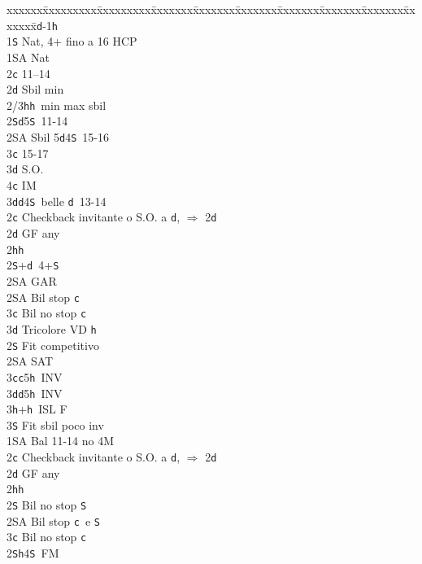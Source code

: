 \documentclass[a4paper,italian]{article}
\newcommand{\BS}{\small{\texttt{S}}}
\newcommand{\BC}{\small{\texttt{c}}}
\newcommand{\BD}{\small{\texttt{d}}}
\newcommand{\BH}{\small{\texttt{h}}}
\newenvironment{bidtable}
{\begin{tabbing}

    xxxxxx\=xxxxxxxxx\=xxxxxxxxx\=xxxxxxx\=xxxxxxx\=xxxxxxx\=xxxxxxx\=xxxxxxx\=xxxxxxx\=xxxxxxx\=\kill}
{\end{tabbing} }%
\begin{document}
\begin{multicols}{2}
    \begin{bidtable}
        1\BD-1\BH\+\\
        1\BS \> Nat, 4+ fino a 16 HCP\+\\
        1\small{SA} \> Nat\+\\
        2\BC {} 11--14\\
        2\BD \> Sbil min\\
        2/3\BH {}\BH\ min max sbil\\
        2\BS {}\BD 5\BS\ 11-14\\
        2\small{SA} \> Sbil 5\BD 4\BS\ 15-16\\
        3\BC {} 15-17\+\\
        3\BD \> S.O.\\
        4\BC \> IM\-\\
        3\BD {}\BD 4\BS\ belle \BD\ 13-14\-\\
        2\BC \> Checkback invitante o S.O. a \BD , $\Rightarrow$ 2\BD \\
        2\BD \> GF any\+\\
        2\BH {}\BH \\
        2\BS {}+\BD\ 4+\BS \+\\
        2\small{SA} \> GAR\-\\
        2\small{SA} \> Bil stop \BC \\
        3\BC \> Bil no stop \BC \\
        3\BD \> Tricolore VD \BH \-\\
        [2pt]2\BS \> Fit competitivo\\
        2\small{SA} \small{SA}T\\
        3\BC {}\BC 5\BH\ INV\\
        3\BD {}\BD 5\BH\ INV\\
        3\BH {}+\BH\ ISL F\\
        3\BS \> Fit sbil poco inv\-\\
        1\small{SA} \> Bal 11-14 no 4M\+\\
        2\BC \> Checkback invitante o S.O. a \BD , $\Rightarrow$ 2\BD \\
        2\BD \> GF any\+\\
        2\BH {}\BH \\
        2\BS \> Bil no stop \BS \\
        2\small{SA} \> Bil stop \BC\ e \BS \\
        3\BC \> Bil no stop \BC \-\\
        2\BS {}\BH 4\BS\ FM\\

\end{bidtable}
\end{multicols}
\end{document}
